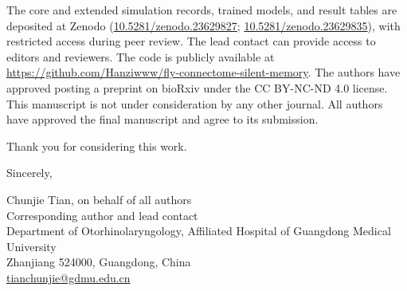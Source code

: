 \documentclass[11pt, letterpaper]{article}
\begin{document}
The core and extended simulation records, trained models, and result tables are deposited at Zenodo
(\href{https://doi.org/10.5281/zenodo.23629827}{10.5281/zenodo.23629827}; \href{https://doi.org/10.5281/zenodo.23629835}{10.5281/zenodo.23629835}), with restricted access during peer review. The lead contact can provide access to editors and reviewers. The code is publicly available at
\url{https://github.com/Hanziwww/fly-connectome-silent-memory}. The authors have approved posting a preprint on bioRxiv under the CC BY-NC-ND 4.0 license.
This manuscript is not under consideration by any other journal. All authors have approved the final manuscript and agree to its submission.

Thank you for considering this work.

Sincerely,

Chunjie Tian, on behalf of all authors\\
Corresponding author and lead contact\\
Department of Otorhinolaryngology, Affiliated Hospital of Guangdong Medical University\\
Zhanjiang 524000, Guangdong, China\\
\href{mailto:tianchunjie@gdmu.edu.cn}{tianchunjie@gdmu.edu.cn}
\end{document}
